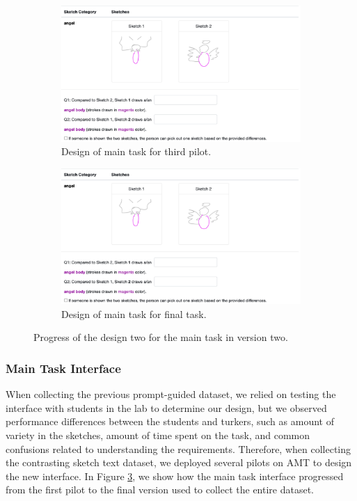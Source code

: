 \begin{figure}[!htb]
\ContinuedFloat
\begin{subfigure}{\textwidth}
  \centering
  \includegraphics[width=.8\linewidth]{data_collection/pilot_02_04_annotation.png}  
  \caption{Design of main task for third pilot.}
  \label{v2.main_task.1.c}
\end{subfigure}
\newline
\begin{subfigure}{\textwidth}
  \centering
  \includegraphics[width=.8\linewidth]{data_collection/pilot_02_04_annotation.png}  
  \caption{Design of main task for final task.}
  \label{v2.main_task.1.d}
\end{subfigure}
\caption{Progress of the design two for the main task in version two.}
\label{v2.main_task.1}
\end{figure}

\subsubsection{Main Task Interface}
When collecting the previous prompt-guided dataset, we relied on testing the interface with students in the lab to determine our design, but we observed performance differences between the students and turkers, such as amount of variety in the sketches, amount of time spent on the task, and common confusions related to understanding the requirements. 
Therefore, when collecting the contrasting sketch text dataset, we deployed several pilots on AMT to design the new interface.  
In Figure \ref{v2.main_task.1}, we show how the main task interface progressed from the first pilot to the final version used to collect the entire dataset. 

